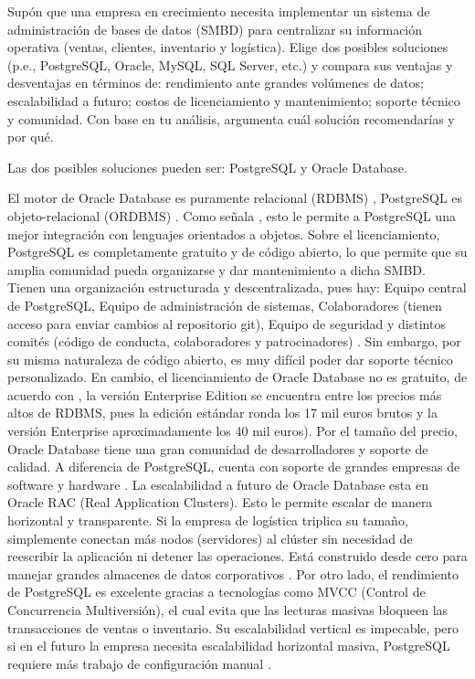 \item Supón que una empresa en crecimiento necesita implementar un sistema de administración de bases de datos (SMBD) para centralizar su información operativa (ventas, clientes, inventario y logística). Elige dos posibles soluciones (p.e., PostgreSQL, Oracle, MySQL, SQL Server, etc.) y compara sus ventajas y desventajas en términos de: rendimiento ante grandes volúmenes de datos; escalabilidad a futuro; costos de licenciamiento y mantenimiento; soporte técnico y comunidad. Con base en tu análisis, argumenta cuál solución recomendarías y por qué.

Las dos posibles soluciones pueden ser: PostgreSQL y Oracle Database. 

El motor de Oracle Database es puramente relacional (RDBMS) \parencite{ionos_oracle_2022}, PostgreSQL es objeto-relacional (ORDBMS) \parencite{postgres_about}. Como señala \textcite{tapia_objeto_2023}, esto le permite a PostgreSQL una mejor integración con lenguajes orientados a objetos. 
Sobre el licenciamiento, PostgreSQL es completamente gratuito y de código abierto, lo que permite que su amplia comunidad pueda organizarse y dar mantenimiento a dicha SMBD. Tienen una organización estructurada y descentralizada, pues hay: Equipo central de PostgreSQL, Equipo de administración de sistemas, Colaboradores (tienen acceso para enviar cambios al repositorio git), Equipo de seguridad y distintos comités (código de conducta, colaboradores y patrocinadores) \parencite{postgres_about}. Sin embargo, por su misma naturaleza de código abierto, es muy difícil poder dar soporte técnico personalizado. En cambio, el licenciamiento de Oracle Database no es gratuito, de acuerdo con \textcite{ionos_oracle_2022}, la versión Enterprise Edition se encuentra entre los precios más altos de RDBMS, pues la edición estándar ronda los 17 mil euros brutos y la versión Enterprise aproximadamente los 40 mil euros). Por el tamaño del precio, Oracle Database tiene una gran comunidad de desarrolladores y soporte de calidad. A diferencia de PostgreSQL, cuenta con soporte de grandes empresas de software y hardware \parencite{ionos_oracle_2022}. 
La escalabilidad a futuro de Oracle Database esta en Oracle RAC (Real Application Clusters). Esto le permite escalar de manera horizontal y transparente. Si la empresa de logística triplica su tamaño, simplemente conectan más nodos (servidores) al clúster sin necesidad de reescribir la aplicación ni detener las operaciones. Está construido desde cero para manejar grandes almacenes de datos corporativos \parencite{oracle_rac}.
Por otro lado, el rendimiento de PostgreSQL es excelente gracias a tecnologías como MVCC (Control de Concurrencia Multiversión), el cual evita que las lecturas masivas bloqueen las transacciones de ventas o inventario. Su escalabilidad vertical es impecable, pero si en el futuro la empresa necesita escalabilidad horizontal masiva, PostgreSQL requiere más trabajo de configuración manual \parencite{postgres_mvcc}. 

